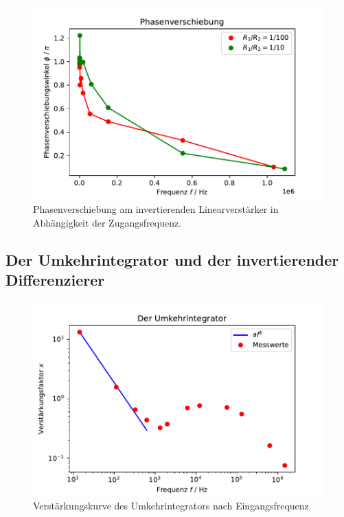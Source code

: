   \begin{figure}
    \centering
    \includegraphics{content/grafiken/phasenverschiebung.pdf}
    \caption{Phasenverschiebung am invertierenden Linearverstärker in Abhängigkeit der Zugangsfrequenz.}
    \label{fig:phasenverschiebung}
  \end{figure}



\subsection{Der Umkehrintegrator und der invertierender Differenzierer}
\label{sec:umkehrintegrator}
\begin{figure}
    \centering
    \includegraphics{content/grafiken/umkehrintegrator.pdf}
    \caption{Verstärkungskurve des Umkehrintegrators nach Eingangsfrequenz}
    \label{fig:umkehrintegrator}
  \end{figure}


